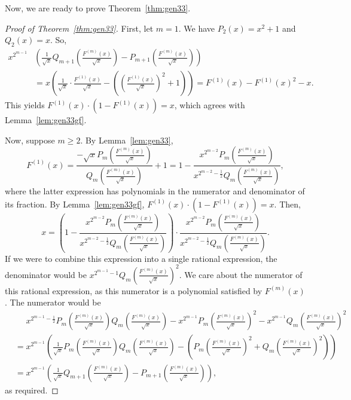\documentclass[12pt]{amsart}
\newcommand{\gfnoa}[1]{F^{(#1)}(x)}
\begin{document}
Now, we are ready to prove Theorem~\ref{thm:gen33}.
\begin{proof}[Proof of Theorem~\ref{thm:gen33}]
    First, let $m=1$. 
    We have $P_2(x)=x^2+1$ and $Q_2(x)=x$. So,
    \begin{align*}
        x^{2^{m-1}}&\left(\frac{1}{\sqrt{x}}Q_{m+1}\!\left(\frac{\gfnoa{m}}{\sqrt{x}}\right)-P_{m+1}\!\left(\frac{\gfnoa{m}}{\sqrt{x}}\right)\right) \\
        &=x\left(\frac{1}{\sqrt{x}}\cdot\frac{\gfnoa{1}}{\sqrt{x}}-\left(\left(\frac{\gfnoa{1}}{\sqrt{x}}\right)^2+1\right)\right)
        =\gfnoa{1}-\gfnoa{1}^2-x.
    \end{align*}
    This yields $\gfnoa{1}\cdot\left(1-\gfnoa{1}\right)=x$, which agrees with Lemma~\ref{lem:gen33gf}.
    
    Now, suppose $m\geq2$. By Lemma~\ref{lem:gen33},
    \[
    \gfnoa{1}=\frac{-\sqrt{x}P_{m}\!\left(\frac{\gfnoa{m}}{\sqrt{x}}\right)}{Q_{m}\!\left(\frac{\gfnoa{m}}{\sqrt{x}}\right)}+1=1-\frac{x^{2^{m-2}}P_m\!\left(\frac{\gfnoa{m}}{\sqrt{x}}\right)}{x^{2^{m-2}-\frac{1}{2}}Q_m\!\left(\frac{\gfnoa{m}}{\sqrt{x}}\right)},
    \]
    where the latter expression has polynomials in the numerator and denominator of its fraction. By Lemma~\ref{lem:gen33gf}, $\gfnoa{1}\cdot\left(1-\gfnoa{1}\right)=x$. Then,
    \[
    x=\left(1-\frac{x^{2^{m-2}}P_m\!\left(\frac{\gfnoa{m}}{\sqrt{x}}\right)}{x^{2^{m-2}-\frac{1}{2}}Q_m\!\left(\frac{\gfnoa{m}}{\sqrt{x}}\right)}\right)\cdot\frac{x^{2^{m-2}}P_m\!\left(\frac{\gfnoa{m}}{\sqrt{x}}\right)}{x^{2^{m-2}-\frac{1}{2}}Q_m\!\left(\frac{\gfnoa{m}}{\sqrt{x}}\right)}.
    \]
    If we were to combine this expression into a single rational expression, the denominator would be $x^{2^{m-1}-1}Q_m\!\left(\frac{\gfnoa{m}}{\sqrt{x}}\right)^2$. We care about the numerator of this rational expression, as this numerator is a polynomial satisfied by $\gfnoa{m}$. The numerator would be
    \begin{align*}
        &\phantom{=}x^{2^{m-1}-\frac{1}{2}}P_m\!\left(\frac{\gfnoa{m}}{\sqrt{x}}\right)Q_m\!\left(\frac{\gfnoa{m}}{\sqrt{x}}\right)-x^{2^{m-1}}P_m\!\left(\frac{\gfnoa{m}}{\sqrt{x}}\right)^2-x^{2^{m-1}}Q_m\!\left(\frac{\gfnoa{m}}{\sqrt{x}}\right)^2\\
        &=x^{2^{m-1}}\left(\frac{1}{\sqrt{x}}P_m\!\left(\frac{\gfnoa{m}}{\sqrt{x}}\right)Q_m\!\left(\frac{\gfnoa{m}}{\sqrt{x}}\right)-\left(P_m\!\left(\frac{\gfnoa{m}}{\sqrt{x}}\right)^2+Q_m\!\left(\frac{\gfnoa{m}}{\sqrt{x}}\right)^2\right)\right)\\
        &=x^{2^{m-1}}\left(\frac{1}{\sqrt{x}}Q_{m+1}\!\left(\frac{\gfnoa{m}}{\sqrt{x}}\right)-P_{m+1}\!\left(\frac{\gfnoa{m}}{\sqrt{x}}\right)\right),
    \end{align*}
    as required.
\end{proof}
\end{document}
